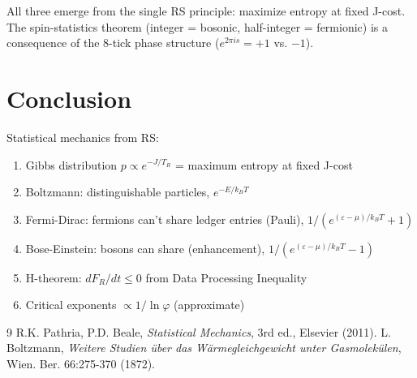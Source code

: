 \documentclass[12pt,a4paper]{article}
\theoremstyle{definition}
\theoremstyle{remark}
\begin{document}
All three emerge from the single RS principle: maximize entropy at fixed J-cost.
The spin-statistics theorem (integer = bosonic, half-integer = fermionic) is a 
consequence of the 8-tick phase structure ($e^{2\pi i s} = +1$ vs. $-1$).

\section{Conclusion}

Statistical mechanics from RS:
\begin{enumerate}
\item Gibbs distribution $p \propto e^{-J/T_R}$ = maximum entropy at fixed J-cost
\item Boltzmann: distinguishable particles, $e^{-E/k_B T}$
\item Fermi-Dirac: fermions can't share ledger entries (Pauli), $1/(e^{(\varepsilon-\mu)/k_BT}+1)$
\item Bose-Einstein: bosons can share (enhancement), $1/(e^{(\varepsilon-\mu)/k_BT}-1)$
\item H-theorem: $dF_R/dt \leq 0$ from Data Processing Inequality
\item Critical exponents $\propto 1/\ln\varphi$ (approximate)
\end{enumerate}

\begin{thebibliography}{9}
 R.K. Pathria, P.D. Beale, \emph{Statistical Mechanics}, 3rd ed., Elsevier (2011).
 L. Boltzmann, \emph{Weitere Studien über das Wärmegleichgewicht unter Gasmolekülen}, Wien. Ber. 66:275-370 (1872).
\end{thebibliography}
\end{document}
